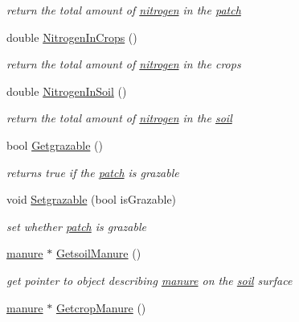 \begin{DoxyCompactItemize}
\begin{DoxyCompactList}\small\item\em return the total amount of \hyperlink{classnitrogen}{nitrogen} in the \hyperlink{classpatch}{patch} \item\end{DoxyCompactList}\item 
double \hyperlink{classpatch_ae9173a337c4a025669947a8cd64f5d2e}{NitrogenInCrops} ()
\begin{DoxyCompactList}\small\item\em return the total amount of \hyperlink{classnitrogen}{nitrogen} in the crops \item\end{DoxyCompactList}\item 
double \hyperlink{classpatch_adcb1581cac2687cd3d610faec438d935}{NitrogenInSoil} ()
\begin{DoxyCompactList}\small\item\em return the total amount of \hyperlink{classnitrogen}{nitrogen} in the \hyperlink{classsoil}{soil} \item\end{DoxyCompactList}\item 
bool \hyperlink{classpatch_a13f8cc5a183f31aefe0b6fbf313e11b9}{Getgrazable} ()
\begin{DoxyCompactList}\small\item\em returns true if the \hyperlink{classpatch}{patch} is grazable \item\end{DoxyCompactList}\item 
void \hyperlink{classpatch_a6e95e7ea2fbab3b4dac4747ad2331648}{Setgrazable} (bool isGrazable)
\begin{DoxyCompactList}\small\item\em set whether \hyperlink{classpatch}{patch} is grazable \item\end{DoxyCompactList}\item 
\hyperlink{classmanure}{manure} $\ast$ \hyperlink{classpatch_a068ad8fb3dcd42c165c25fef304df220}{GetsoilManure} ()
\begin{DoxyCompactList}\small\item\em get pointer to object describing \hyperlink{classmanure}{manure} on the \hyperlink{classsoil}{soil} surface \item\end{DoxyCompactList}\item 
\hyperlink{classmanure}{manure} $\ast$ \hyperlink{classpatch_a7efc99bd3ae91359690c12eee53a7e4b}{GetcropManure} ()

\end{DoxyCompactItemize}
